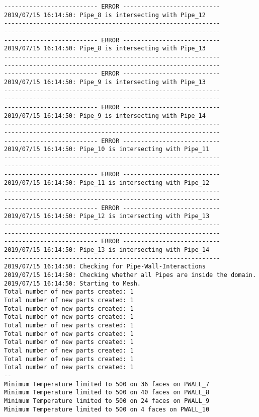 \documentclass{article}
\begin{document}
{\begin{verbatim}
-------------------------- ERROR ---------------------------
2019/07/15 16:14:50: Pipe_8 is intersecting with Pipe_12
------------------------------------------------------------
------------------------------------------------------------
-------------------------- ERROR ---------------------------
2019/07/15 16:14:50: Pipe_8 is intersecting with Pipe_13
------------------------------------------------------------
------------------------------------------------------------
-------------------------- ERROR ---------------------------
2019/07/15 16:14:50: Pipe_9 is intersecting with Pipe_13
------------------------------------------------------------
------------------------------------------------------------
-------------------------- ERROR ---------------------------
2019/07/15 16:14:50: Pipe_9 is intersecting with Pipe_14
------------------------------------------------------------
------------------------------------------------------------
-------------------------- ERROR ---------------------------
2019/07/15 16:14:50: Pipe_10 is intersecting with Pipe_11
------------------------------------------------------------
------------------------------------------------------------
-------------------------- ERROR ---------------------------
2019/07/15 16:14:50: Pipe_11 is intersecting with Pipe_12
------------------------------------------------------------
------------------------------------------------------------
-------------------------- ERROR ---------------------------
2019/07/15 16:14:50: Pipe_12 is intersecting with Pipe_13
------------------------------------------------------------
------------------------------------------------------------
-------------------------- ERROR ---------------------------
2019/07/15 16:14:50: Pipe_13 is intersecting with Pipe_14
------------------------------------------------------------
2019/07/15 16:14:50: Checking for Pipe-Wall-Interactions
2019/07/15 16:14:50: Checking whether all Pipes are inside the domain.
2019/07/15 16:14:50: Starting to Mesh.
Total number of new parts created: 1
Total number of new parts created: 1
Total number of new parts created: 1
Total number of new parts created: 1
Total number of new parts created: 1
Total number of new parts created: 1
Total number of new parts created: 1
Total number of new parts created: 1
Total number of new parts created: 1
Total number of new parts created: 1
--
Minimum Temperature limited to 500 on 36 faces on PWALL_7
Minimum Temperature limited to 500 on 40 faces on PWALL_8
Minimum Temperature limited to 500 on 24 faces on PWALL_9
Minimum Temperature limited to 500 on 4 faces on PWALL_10

\end{verbatim}}
\end{document}
